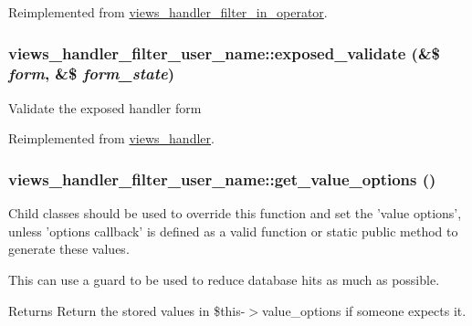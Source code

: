 Reimplemented from \hyperlink{classviews__handler__filter__in__operator_a2c17bde9b5cb3498d31786ba888d545c}{views\_\-handler\_\-filter\_\-in\_\-operator}.\hypertarget{classviews__handler__filter__user__name_a3510a0e9b2c5fea7460a42049e0a58c0}{
\subsubsection[{exposed\_\-validate}]{\setlength{\rightskip}{0pt plus 5cm}views\_\-handler\_\-filter\_\-user\_\-name::exposed\_\-validate (\&\$ {\em form}, \/  \&\$ {\em form\_\-state})}}
\label{classviews__handler__filter__user__name_a3510a0e9b2c5fea7460a42049e0a58c0}
Validate the exposed handler form 

Reimplemented from \hyperlink{classviews__handler_a2dd536754e4764cc82ffe7c864f54b16}{views\_\-handler}.\hypertarget{classviews__handler__filter__user__name_a039044fb84e609938564ae6c8a40580c}{
\subsubsection[{get\_\-value\_\-options}]{\setlength{\rightskip}{0pt plus 5cm}views\_\-handler\_\-filter\_\-user\_\-name::get\_\-value\_\-options ()}}
\label{classviews__handler__filter__user__name_a039044fb84e609938564ae6c8a40580c}
Child classes should be used to override this function and set the 'value options', unless 'options callback' is defined as a valid function or static public method to generate these values.

This can use a guard to be used to reduce database hits as much as possible.

\begin{DoxyReturn}{Returns}
Return the stored values in \$this-\/$>$value\_\-options if someone expects it. 
\end{DoxyReturn}


